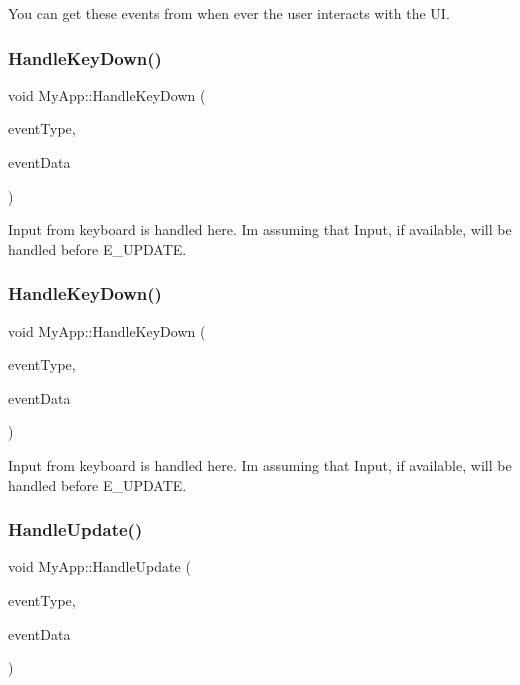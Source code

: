 You can get these events from when ever the user interacts with the UI. \mbox{\label{class_my_app_aef5d37aa52f53ea9c218ce6b21328068}} 
\subsubsection{\texorpdfstring{HandleKeyDown()}{HandleKeyDown()}\hspace{0.1cm}{\footnotesize\ttfamily [1/2]}}
{\footnotesize\ttfamily void My\+App\+::\+Handle\+Key\+Down (\begin{DoxyParamCaption}\item[{String\+Hash}]{event\+Type,  }\item[{Variant\+Map \&}]{event\+Data }\end{DoxyParamCaption})\hspace{0.3cm}{\ttfamily [inline]}}

Input from keyboard is handled here. I\textquotesingle{}m assuming that Input, if available, will be handled before E\+\_\+\+U\+P\+D\+A\+TE. \mbox{\label{class_my_app_aef5d37aa52f53ea9c218ce6b21328068}} 
\subsubsection{\texorpdfstring{HandleKeyDown()}{HandleKeyDown()}\hspace{0.1cm}{\footnotesize\ttfamily [2/2]}}
{\footnotesize\ttfamily void My\+App\+::\+Handle\+Key\+Down (\begin{DoxyParamCaption}\item[{String\+Hash}]{event\+Type,  }\item[{Variant\+Map \&}]{event\+Data }\end{DoxyParamCaption})\hspace{0.3cm}{\ttfamily [inline]}}

Input from keyboard is handled here. I\textquotesingle{}m assuming that Input, if available, will be handled before E\+\_\+\+U\+P\+D\+A\+TE. \mbox{\label{class_my_app_abf4073723da0b7225df1b29d3fc085b1}} 
\subsubsection{\texorpdfstring{HandleUpdate()}{HandleUpdate()}}
{\footnotesize\ttfamily void My\+App\+::\+Handle\+Update (\begin{DoxyParamCaption}\item[{String\+Hash}]{event\+Type,  }\item[{Variant\+Map \&}]{event\+Data }\end{DoxyParamCaption})\hspace{0.3cm}{\ttfamily [inline]}}

